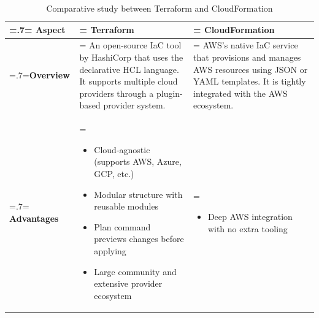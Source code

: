 \begin{table}[H]
    \renewcommand{\arraystretch}{1.5}%
    \caption{Comparative study between Terraform and CloudFormation}
    \label{tab:iac_tools}
    \centering
    \medskip
    \begin{tabularx}{1\textwidth} {
            | >{\hsize=.7\hsize\linewidth=\hsize\centering\arraybackslash}X
            | >{\hsize=1.15\hsize\linewidth=\hsize\justifying\arraybackslash}X
            | >{\hsize=1.15\hsize\linewidth=\hsize\justifying\arraybackslash}X |}
        \hline
        \rowcolor{primary} \textbf {Aspect} & \textbf{Terraform}                                                                                                                                                                                                                     & \textbf{CloudFormation}                                                                                                                                                                                                                                           \\
        \hline
        \textbf {Overview}                  & \noindent An open-source IaC tool by HashiCorp that uses the declarative HCL language. It supports multiple cloud providers through a plugin-based provider system.                                                                                                             & \noindent AWS's native IaC service that provisions and manages AWS resources using JSON or YAML templates. It is tightly integrated with the AWS ecosystem.                                                                                                                                                                                   \\
        \hline
        \textbf {Advantages}                & \begin{itemize}[leftmargin=*, topsep=0pt, itemsep=1pt, parsep=2pt]
            \item Cloud-agnostic (supports AWS, Azure, GCP, etc.)
            \item Modular structure with reusable modules
            \item Plan command previews changes before applying
            \item Large community and extensive provider ecosystem
        \end{itemize} & \begin{itemize}[leftmargin=*, topsep=0pt, itemsep=1pt, parsep=2pt]
            \item Deep AWS integration with no extra tooling

\end{itemize}
\end{tabularx}
\end{table}
